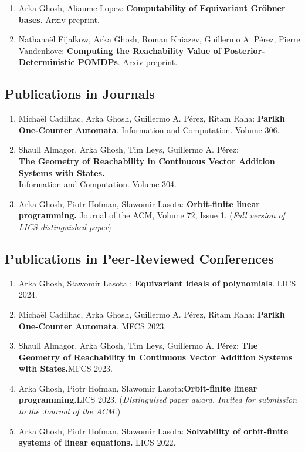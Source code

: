 \documentclass[11pt]{article}
\begin{document}
\begin{enumerate}
\item[$\diamond$]
Arka Ghosh, Aliaume Lopez:
\textbf{Computability of Equivariant Gr\"{o}bner bases}.
Arxiv preprint.
\item[$\diamond$]
Nathana\"{e}l Fijalkow, Arka Ghosh, Roman Kniazev, Guillermo A. P\'{e}rez, Pierre Vandenhove: \textbf{Computing the Reachability Value of Posterior-Deterministic POMDPs}. Arxiv preprint.
\end{enumerate}
%
\subsection*{Publications in Journals}
\smallskip
\begin{enumerate}
\item[$\diamond$]
Micha\"{e}l Cadilhac, Arka Ghosh, Guillermo A. P\'{e}rez, Ritam Raha:
\textbf{Parikh One-Counter Automata}.
Information and Computation. Volume 306.
\item[$\diamond$] Shaull Almagor, Arka Ghosh, Tim Leys, Guillermo A. P\' erez:\\
\textbf{The Geometry of Reachability in Continuous Vector Addition Systems with States.}\\
Information and Computation. Volume 304.
\item[$\diamond$] Arka Ghosh, Piotr Hofman, S\l awomir Lasota:
\textbf{Orbit-finite linear programming.}
Journal of the ACM, Volume 72, Issue 1.
(\textcolor{BrickRed}{\textit{Full version of LICS distinguished paper}})
\end{enumerate}
%
\subsection*{Publications in Peer-Reviewed Conferences}
\smallskip
\begin{enumerate}
\item[$\diamond$]
Arka Ghosh, S\l{}awomir Lasota : \textbf{Equivariant ideals of polynomials}.
LICS 2024.
\item[$\diamond$]
Micha\"{e}l Cadilhac, Arka Ghosh, Guillermo A. P\'{e}rez, Ritam Raha:
\textbf{Parikh One-Counter Automata}.
MFCS 2023.

\item[$\diamond$] Shaull Almagor, Arka Ghosh, Tim Leys, Guillermo A. P\'{e}rez:
\textbf{The Geometry of Reachability in Continuous Vector Addition Systems with States.}MFCS 2023.
\item[$\diamond$]
Arka Ghosh, Piotr Hofman, S\l awomir Lasota:\textbf{Orbit-finite linear programming.}LICS 2023.
(\textcolor{BrickRed}{\textit{Distinguised paper award. Invited for submission to the Journal of the ACM.}})
\item[$\diamond$]
Arka Ghosh, Piotr Hofman, S\l awomir Lasota:
\textbf{Solvability of orbit-finite systems of linear equations.}
LICS 2022.
\end{enumerate}
%
\end{document}
